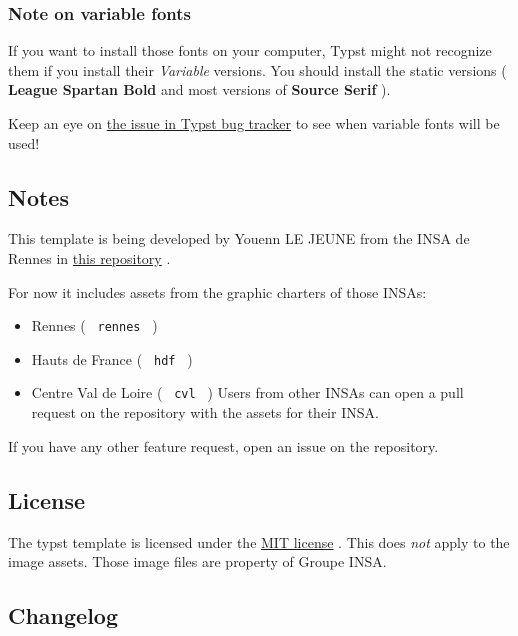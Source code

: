 \subsubsection{Note on variable fonts}\label{note-on-variable-fonts}

If you want to install those fonts on your computer, Typst might not
recognize them if you install their \emph{Variable} versions. You should
install the static versions ( \textbf{League Spartan Bold} and most
versions of \textbf{Source Serif} ).

Keep an eye on \href{https://github.com/typst/typst/issues/185}{the
issue in Typst bug tracker} to see when variable fonts will be used!

\subsection{Notes}\label{notes}

This template is being developed by Youenn LE JEUNE from the INSA de
Rennes in \href{https://github.com/SkytAsul/INSA-Typst-Template}{this
repository} .

For now it includes assets from the graphic charters of those INSAs:

\begin{itemize}
\tightlist
\item
  Rennes ( \texttt{\ rennes\ } )
\item
  Hauts de France ( \texttt{\ hdf\ } )
\item
  Centre Val de Loire ( \texttt{\ cvl\ } ) Users from other INSAs can
  open a pull request on the repository with the assets for their INSA.
\end{itemize}

If you have any other feature request, open an issue on the repository.

\subsection{License}\label{license}

The typst template is licensed under the
\href{https://github.com/SkytAsul/INSA-Typst-Template/blob/main/LICENSE}{MIT
license} . This does \emph{not} apply to the image assets. Those image
files are property of Groupe INSA.

\subsection{Changelog}\label{changelog}

